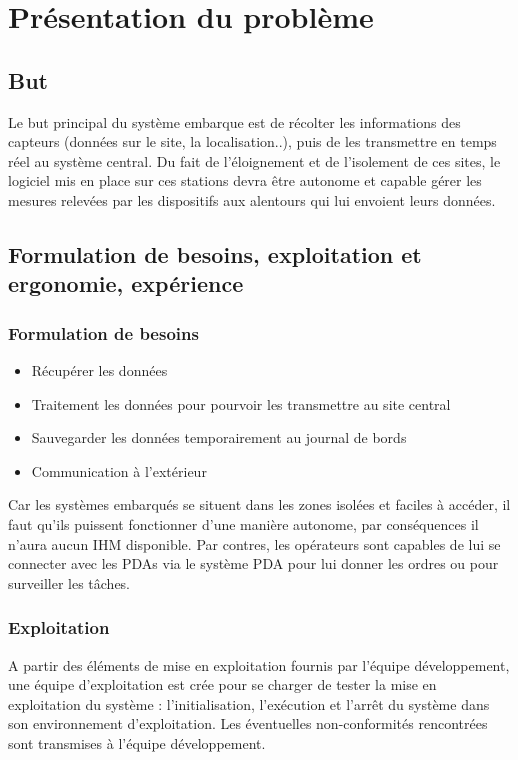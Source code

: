 \section{Présentation du problème}
	\subsection{But}

	Le but principal du système embarque est de récolter les informations des capteurs (données sur le site, la localisation..), puis de les transmettre en temps réel au système central. Du fait de l'éloignement et de l'isolement de ces sites, le logiciel mis en place sur ces stations devra être autonome et capable gérer les mesures relevées par les dispositifs aux alentours qui lui envoient leurs données.

	\subsection{Formulation de besoins, exploitation et ergonomie, expérience}

		\subsubsection{Formulation de besoins}
		\begin{itemize}
		   \item Récupérer les données
	 		\item Traitement les données pour pourvoir les transmettre au site central
	 		\item Sauvegarder les données temporairement au journal de bords
			\item Communication à l’extérieur
		\end{itemize}
			
		Car les systèmes embarqués se situent dans les zones isolées et faciles à accéder, il faut qu’ils puissent fonctionner d’une manière autonome, par conséquences il n’aura aucun IHM disponible. Par contres, les opérateurs sont capables de lui se connecter avec les PDAs via le système PDA pour lui donner les ordres ou pour surveiller les tâches. 

		\subsubsection{Exploitation}
		A partir des éléments de mise en exploitation fournis par l’équipe développement, une équipe d’exploitation est crée pour se charger de tester la mise en exploitation du système : l’initialisation, l’exécution et l’arrêt du système dans son environnement d’exploitation. Les éventuelles non-conformités rencontrées sont transmises à l’équipe développement.
		
